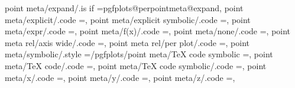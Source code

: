 point meta/expand/.is if                                           =pgfplots@perpointmeta@expand,                                                                                                      
point meta/explicit/.code                                          ={},                                                                                         
point meta/explicit symbolic/.code                                 ={},                                                                                
point meta/expr/.code                                              ={},                                                                                           
point meta/f(x)/.code                                              ={},                                                                                             
point meta/none/.code                                              ={},                                                                                                 
point meta rel/axis wide/.code                                     ={\def\pgfplots@perpointmeta@rel@choice{0}},                                                                                       
point meta rel/per plot/.code                                      ={\def\pgfplots@perpointmeta@rel@choice{1}},                                                                                       
point meta/symbolic/.style                                         ={/pgfplots/point meta/TeX code symbolic                                                                                            ={\edef\pgfplotspointmeta{#1}}},                           
point meta/TeX code/.code                                          ={},                                                                                       
point meta/TeX code symbolic/.code                                 ={},                                                                              
point meta/x/.code                                                 ={},                                                                                                
point meta/y/.code                                                 ={},                                                                                                
point meta/z/.code                                                 ={},                                                                                                



